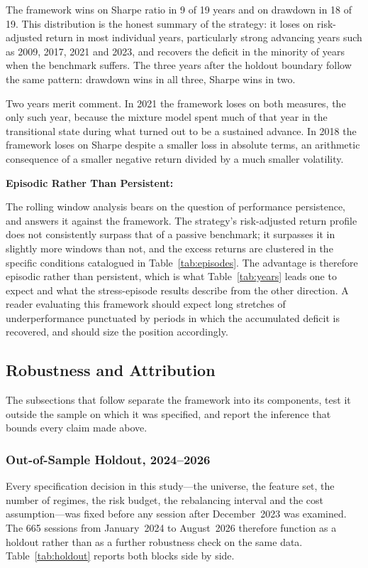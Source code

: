The framework wins on Sharpe ratio in 9 of 19 years and on drawdown in 18 of 19. This
distribution is the honest summary of the strategy: it loses on risk-adjusted return in
most individual years, particularly strong advancing years such as 2009, 2017, 2021 and
2023, and recovers the deficit in the minority of years when the benchmark suffers. The
three years after the holdout boundary follow the same pattern: drawdown wins in all
three, Sharpe wins in two.

Two years merit comment. In 2021 the framework loses on both measures, the only such
year, because the mixture model spent much of that year in the transitional state during
what turned out to be a sustained advance. In 2018 the framework loses on Sharpe despite
a smaller loss in absolute terms, an arithmetic consequence of a smaller negative return
divided by a much smaller volatility.

\textbf{Episodic Rather Than Persistent:}

The rolling window analysis bears on the question of performance persistence, and answers
it against the framework. The strategy's risk-adjusted return profile does not
consistently surpass that of a passive benchmark; it surpasses it in slightly more windows
than not, and the excess returns are clustered in the specific conditions catalogued in
Table~\ref{tab:episodes}. The advantage is therefore episodic rather than persistent,
which is what Table~\ref{tab:years} leads one to expect and what the stress-episode
results describe from the other direction. A reader evaluating this
framework should expect long stretches of underperformance punctuated by periods in which
the accumulated deficit is recovered, and should size the position accordingly.

\subsection{Robustness and Attribution}

The subsections that follow separate the framework into its components, test it outside
the sample on which it was specified, and report the inference that bounds every claim
made above.

\subsubsection{Out-of-Sample Holdout, 2024--2026}
\label{sec:holdout}

Every specification decision in this study---the universe, the feature set, the number of
regimes, the risk budget, the rebalancing interval and the cost assumption---was fixed
before any session after December~2023 was examined. The 665 sessions from January~2024
to August~2026 therefore function as a holdout rather than as a further robustness check
on the same data. Table~\ref{tab:holdout} reports both blocks side by side.


